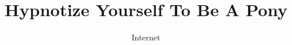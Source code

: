 \documentclass[ebook,12pt,oneside,openany]{memoir}
\begin{document}
\title{Hypnotize Yourself To Be A Pony}
\author{Internet}
\maketitle

\newpage
\end{document}
